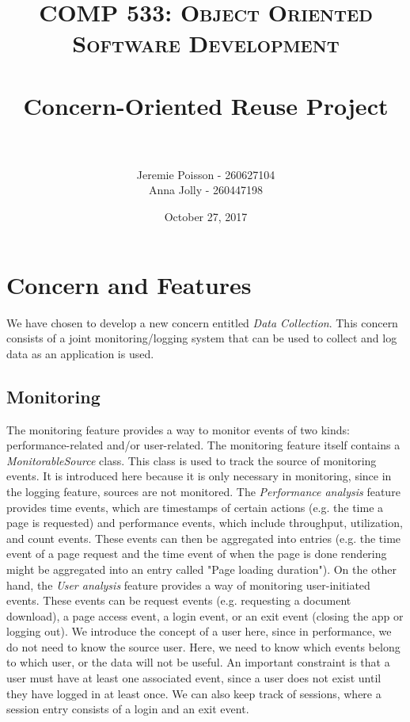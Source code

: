 \documentclass[paper=letter, fontsize=12pt]{scrartcl} %
\title{	
\normalfont \normalsize 
\textsc{COMP 533: Object Oriented Software Development} \\ [25pt] %
\horrule{0.5pt} \\[0.4cm] %
\huge Concern-Oriented Reuse Project \\ %
\horrule{2pt} \\[0.5cm] %
}
\author{Jeremie Poisson - 260627104 \\ Anna Jolly - 260447198} %
\date{\normalsize October 27, 2017} %
\numberwithin{equation}{section} %
\numberwithin{figure}{section} %
\numberwithin{table}{section} %
\begin{document}
\maketitle %

\section{Concern and Features}

We have chosen to develop a new concern entitled \textit{Data Collection}. This concern consists of a joint monitoring/logging system that can be used to collect and log data as an application is used.

\subsection{Monitoring}
\hspace*{.5cm} The monitoring feature provides a way to monitor events of two kinds: performance-related and/or user-related. The monitoring feature itself contains a \textit{MonitorableSource} class. This class is used to track the source of monitoring events. It is introduced here because it is only necessary in monitoring, since in the logging feature, sources are not monitored. The \textit{Performance analysis} feature provides time events, which are timestamps of certain actions (e.g. the time a page is requested) and performance events, which include throughput, utilization, and count events. These events can then be aggregated into entries (e.g. the time event of a page request and the time event of when the page is done rendering might be aggregated into an entry called "Page loading duration"). On the other hand, the \textit{User analysis} feature provides a way of monitoring user-initiated events. These events can be request events (e.g. requesting a document download), a page access event, a login event, or an exit event (closing the app or logging out). We introduce the concept of a user here, since in performance, we do not need to know the source user. Here, we need to know which events belong to which user, or the data will not be useful. An important constraint is that a user must have at least one associated event, since a user does not exist until they have logged in at least once. We can also keep track of sessions, where a session entry consists of a login and an exit event. \\
\end{document}
